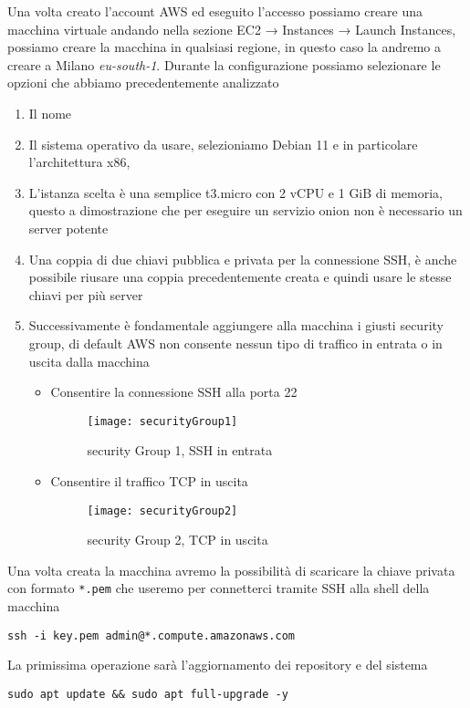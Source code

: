 Una volta creato l'account AWS ed eseguito l'accesso possiamo creare una macchina virtuale andando nella sezione EC2 → Instances → Launch Instances\cite{AwsLaunchInstance}, possiamo creare la macchina in qualsiasi regione, in questo caso la andremo a creare a Milano \emph{eu-south-1}. Durante la configurazione possiamo selezionare le opzioni che abbiamo precedentemente analizzato
\begin{enumerate}
    \item Il nome
    \item Il sistema operativo da usare, selezioniamo Debian 11 e in particolare l'architettura x86,
    \item L'istanza scelta è una semplice t3.micro con 2 vCPU e 1 GiB di memoria, questo a dimostrazione che per eseguire un servizio onion non è necessario un server potente
    \item Una coppia di due chiavi pubblica e privata per la connessione SSH, è anche possibile riusare una coppia precedentemente creata e quindi usare le stesse chiavi per più server
    \item Successivamente è fondamentale aggiungere alla macchina i giusti security group, di default AWS non consente nessun tipo di traffico in entrata o in uscita dalla macchina
    \begin{itemize}
        \item Consentire la connessione SSH alla porta 22
        \begin{figure}[h]
            \centering
            \texttt{[image: securityGroup1]}
            \caption{security Group 1,  SSH in entrata}
            \label{fig:sec1}
        \end{figure}
        
        \item Consentire il traffico TCP in uscita
        \begin{figure}[h]
            \centering
            \texttt{[image: securityGroup2]}
            \caption{security Group 2, TCP in uscita}
            \label{fig:sec2}
        \end{figure}
    \end{itemize}
\end{enumerate}



Una volta creata la macchina avremo la possibilità di scaricare la chiave privata con formato \lstinline{*.pem} che useremo per connetterci tramite SSH alla shell della macchina
\begin{lstlisting}[caption={Connessione SSH}]
    ssh -i key.pem admin@*.compute.amazonaws.com
\end{lstlisting}
La primissima operazione sarà l'aggiornamento dei repository e del sistema
\begin{lstlisting}[caption={Aggiornamento del sistema}]
    sudo apt update && sudo apt full-upgrade -y
\end{lstlisting}

